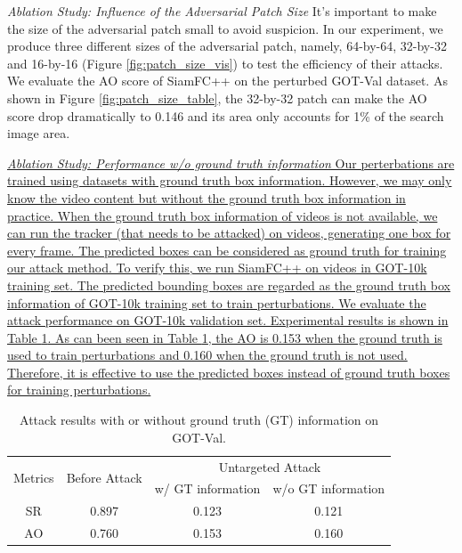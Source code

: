 \documentclass[journal]{IEEEtran}
\begin{document}
\textit{Ablation Study: Influence of the Adversarial Patch Size} 
It's important to make the size of the adversarial patch small to avoid suspicion. In our experiment, we produce three different sizes of the adversarial patch, namely, 64-by-64, 32-by-32 and 16-by-16 (Figure \ref{fig:patch_size_vis}) to test the efficiency of their attacks. We evaluate the AO score of SiamFC++ on the perturbed GOT-Val dataset.
As shown in Figure \ref{fig:patch_size_table}, the 32-by-32 patch can make the AO score drop dramatically to 0.146 and its area only accounts for 1\% of the search image area.

\uline{\textit{Ablation Study: Performance w/o ground truth information} Our perterbations are trained using datasets with ground truth box information.
However, we may only know the video content but without the ground truth box information in practice. When the ground truth box information of videos is not available, we can run the tracker (that needs to be attacked) on videos, generating one box for every frame. The predicted boxes can be considered as ground truth for training our attack method. To verify this, we run SiamFC++ on videos in GOT-10k training set. The predicted bounding boxes are regarded as the ground truth box information of GOT-10k training set to train perturbations. We evaluate the attack performance on GOT-10k validation set. Experimental results is shown in Table \ref{tab:agent}. 
As can been seen in Table \ref{tab:agent}, the AO is 0.153 when the ground truth is used to train perturbations and 0.160 when the ground truth is not used.
Therefore, it is effective to use the predicted boxes instead of ground truth boxes for training perturbations.
}

\begin{table}
    \centering
    \caption{Attack results with or without ground truth (GT) information on GOT-Val.}
    \begin{tabular}{cccc}
        \toprule
        \multirow{2}{*}{Metrics} & \multirow{2}{*}{Before Attack} & \multicolumn{2}{c}{Untargeted Attack}                                            \\
                                 &                                & w/ GT information & w/o GT information \\ \midrule
        SR                       & 0.897                          & 0.123                                & 0.121                                     \\
        AO                       & 0.760                          & 0.153                                & 0.160                                     \\                              
        \bottomrule
    \end{tabular}
    \label{tab:agent}
\end{table}
\end{document}
